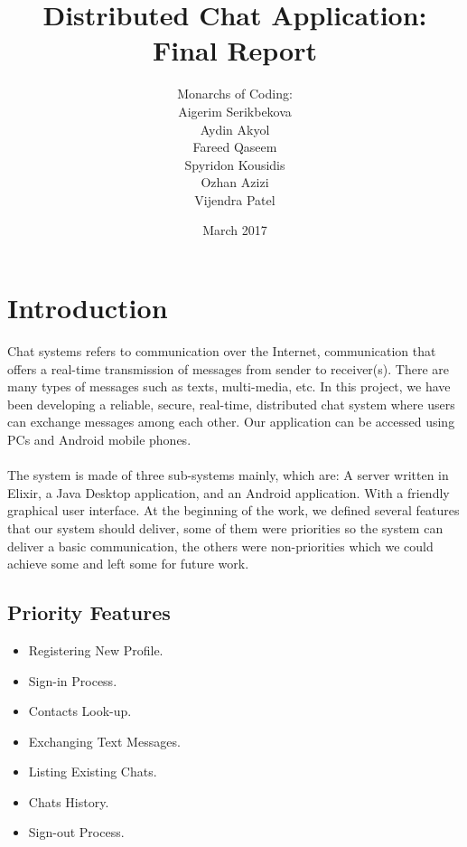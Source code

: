 \documentclass[11pt,a4paper]{report}
\begin{document}
\title{Distributed Chat Application: Final Report}
\author{Monarchs of Coding:\\
  Aigerim Serikbekova\\
  Aydin Akyol\\
  Fareed Qaseem\\
  Spyridon Kousidis\\
  Ozhan Azizi\\
  Vijendra Patel}
\date{March 2017}
\maketitle


\chapter{Introduction}

Chat systems refers to communication over the Internet, communication that offers a real-time transmission of messages from sender to receiver(s). There are many types of messages such as texts, multi-media, etc. In this project, we have been developing a reliable, secure, real-time, distributed chat system where users can exchange messages among each other. Our application can be accessed using PCs and Android mobile phones.\\ \\
The system is made of three sub-systems mainly, which are: A server written in Elixir, a Java Desktop application, and an Android application. With a friendly graphical user interface.
At the beginning of the work, we defined several features that our system should deliver, some of them were priorities so the system can deliver a basic communication, the others were non-priorities which we could achieve some and left some for future work. \\

\section{Priority Features}
	\begin{itemize}
		\item Registering New Profile.
		\item Sign-in Process.
		\item Contacts Look-up.
  		\item Exchanging Text Messages.
 		\item Listing Existing Chats.
		\item Chats History.
		\item Sign-out Process.
	\end{itemize}
\end{document}
